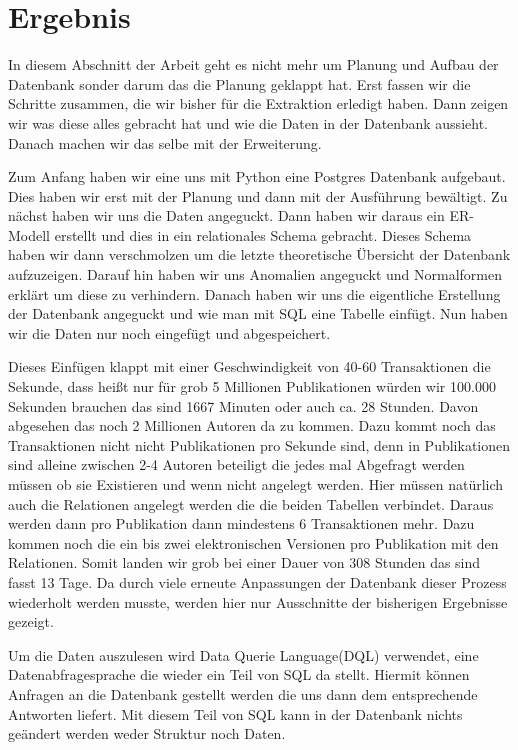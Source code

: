 \newpage
\section{Ergebnis}



In diesem Abschnitt der Arbeit geht es nicht mehr um Planung und Aufbau der Datenbank sonder darum das die Planung geklappt hat. Erst fassen wir die Schritte zusammen, die wir bisher für die Extraktion erledigt haben. Dann zeigen wir was diese alles gebracht hat und wie die Daten in der Datenbank aussieht. Danach machen wir das selbe mit der Erweiterung.


Zum Anfang haben wir eine uns mit Python eine Postgres Datenbank aufgebaut. Dies haben wir erst mit der Planung und dann mit der Ausführung bewältigt. Zu nächst haben wir uns die Daten angeguckt. Dann haben wir daraus ein ER-Modell erstellt und dies in ein relationales Schema gebracht. Dieses Schema haben wir dann verschmolzen um die letzte theoretische Übersicht der Datenbank aufzuzeigen. Darauf hin haben wir uns Anomalien angeguckt und Normalformen erklärt um diese zu verhindern. Danach haben wir uns die eigentliche Erstellung der Datenbank angeguckt und wie man mit SQL eine Tabelle einfügt. Nun haben wir die Daten nur noch eingefügt und abgespeichert.

Dieses Einfügen klappt mit einer Geschwindigkeit von 40-60 Transaktionen die Sekunde, dass heißt nur für grob 5 Millionen Publikationen würden wir 100.000 Sekunden brauchen das sind 1667 Minuten oder auch ca. 28 Stunden. Davon abgesehen das noch 2 Millionen Autoren da zu kommen. Dazu kommt noch das Transaktionen nicht nicht Publikationen pro Sekunde sind, denn in Publikationen sind alleine zwischen 2-4 Autoren beteiligt die jedes mal Abgefragt werden müssen ob sie Existieren und wenn nicht angelegt werden. Hier müssen natürlich auch die Relationen angelegt werden die die beiden Tabellen verbindet. Daraus werden dann pro Publikation dann mindestens 6 Transaktionen mehr. Dazu kommen noch die ein bis zwei elektronischen Versionen pro Publikation mit den Relationen. Somit landen wir grob bei einer Dauer von 308 Stunden das sind fasst 13 Tage. Da durch viele erneute Anpassungen der Datenbank dieser Prozess wiederholt werden musste, werden hier nur Ausschnitte der bisherigen Ergebnisse gezeigt.


Um die Daten auszulesen wird Data Querie Language(DQL) verwendet, eine Datenabfragesprache die wieder ein Teil von SQL da stellt. Hiermit können Anfragen an die Datenbank gestellt werden die uns dann dem entsprechende Antworten liefert. Mit diesem Teil von SQL kann in der Datenbank nichts geändert werden weder Struktur noch Daten.

